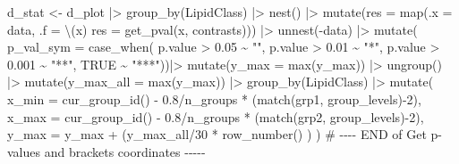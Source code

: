 \documentclass[
  letterpaper,
  DIV=11,
  numbers=noendperiod]{scrreprt}
\newenvironment{Shaded}{\begin{snugshade}}{\end{snugshade}}
\newcommand{\AttributeTok}[1]{\textcolor[rgb]{0.40,0.45,0.13}{#1}}
\newcommand{\CommentTok}[1]{\textcolor[rgb]{0.37,0.37,0.37}{#1}}
\newcommand{\ConstantTok}[1]{\textcolor[rgb]{0.56,0.35,0.01}{#1}}
\newcommand{\DecValTok}[1]{\textcolor[rgb]{0.68,0.00,0.00}{#1}}
\newcommand{\FloatTok}[1]{\textcolor[rgb]{0.68,0.00,0.00}{#1}}
\newcommand{\FunctionTok}[1]{\textcolor[rgb]{0.28,0.35,0.67}{#1}}
\newcommand{\NormalTok}[1]{\textcolor[rgb]{0.00,0.23,0.31}{#1}}
\newcommand{\OtherTok}[1]{\textcolor[rgb]{0.00,0.23,0.31}{#1}}
\newcommand{\RegionMarkerTok}[1]{\textcolor[rgb]{0.00,0.23,0.31}{#1}}
\newcommand{\SpecialCharTok}[1]{\textcolor[rgb]{0.37,0.37,0.37}{#1}}
\newcommand{\StringTok}[1]{\textcolor[rgb]{0.13,0.47,0.30}{#1}}
\begin{document}
\begin{Shaded}
\begin{Highlighting}[]
\NormalTok{d\_stat }\OtherTok{\textless{}{-}}\NormalTok{ d\_plot }\SpecialCharTok{|\textgreater{}}
  \FunctionTok{group\_by}\NormalTok{(LipidClass) }\SpecialCharTok{|\textgreater{}} 
  \FunctionTok{nest}\NormalTok{() }\SpecialCharTok{|\textgreater{}} 
  \FunctionTok{mutate}\NormalTok{(}\AttributeTok{res =} \FunctionTok{map}\NormalTok{(}\AttributeTok{.x =}\NormalTok{ data, }\AttributeTok{.f =}\NormalTok{ \textbackslash{}(x) }\AttributeTok{res =} \FunctionTok{get\_pval}\NormalTok{(x, contrasts))) }\SpecialCharTok{|\textgreater{}} 
  \FunctionTok{unnest}\NormalTok{(}\SpecialCharTok{{-}}\NormalTok{data) }\SpecialCharTok{|\textgreater{}} 
  \FunctionTok{mutate}\NormalTok{(}
    \AttributeTok{p\_val\_sym =} \FunctionTok{case\_when}\NormalTok{(}
\NormalTok{      p.value }\SpecialCharTok{\textgreater{}} \FloatTok{0.05} \SpecialCharTok{\textasciitilde{}} \StringTok{""}\NormalTok{, p.value }\SpecialCharTok{\textgreater{}} \FloatTok{0.01} \SpecialCharTok{\textasciitilde{}} \StringTok{"*"}\NormalTok{, }
\NormalTok{      p.value }\SpecialCharTok{\textgreater{}} \FloatTok{0.001} \SpecialCharTok{\textasciitilde{}} \StringTok{"**"}\NormalTok{, }\ConstantTok{TRUE} \SpecialCharTok{\textasciitilde{}} \StringTok{"***"}\NormalTok{))}\SpecialCharTok{|\textgreater{}}
  \FunctionTok{mutate}\NormalTok{(}\AttributeTok{y\_max =} \FunctionTok{max}\NormalTok{(y\_max)) }\SpecialCharTok{|\textgreater{}}
  \FunctionTok{ungroup}\NormalTok{() }\SpecialCharTok{|\textgreater{}} 
  \FunctionTok{mutate}\NormalTok{(}\AttributeTok{y\_max\_all =} \FunctionTok{max}\NormalTok{(y\_max)) }\SpecialCharTok{|\textgreater{}}
  \FunctionTok{group\_by}\NormalTok{(LipidClass) }\SpecialCharTok{|\textgreater{}} 
  \FunctionTok{mutate}\NormalTok{(}
    \AttributeTok{x\_min =} \FunctionTok{cur\_group\_id}\NormalTok{() }\SpecialCharTok{{-}} \FloatTok{0.8}\SpecialCharTok{/}\NormalTok{n\_groups }\SpecialCharTok{*}\NormalTok{ (}\FunctionTok{match}\NormalTok{(grp1, group\_levels)}\SpecialCharTok{{-}}\DecValTok{2}\NormalTok{),}
    \AttributeTok{x\_max =} \FunctionTok{cur\_group\_id}\NormalTok{() }\SpecialCharTok{{-}} \FloatTok{0.8}\SpecialCharTok{/}\NormalTok{n\_groups }\SpecialCharTok{*}\NormalTok{ (}\FunctionTok{match}\NormalTok{(grp2, group\_levels)}\SpecialCharTok{{-}}\DecValTok{2}\NormalTok{),}
    \AttributeTok{y\_max =}\NormalTok{ y\_max }\SpecialCharTok{+}\NormalTok{ (y\_max\_all}\SpecialCharTok{/}\DecValTok{30} \SpecialCharTok{*} \FunctionTok{row\_number}\NormalTok{() )}
\NormalTok{  )  }
\CommentTok{\# {-}{-}{-}{-} }\RegionMarkerTok{END}\CommentTok{ of Get p{-}values and brackets coordinates  {-}{-}{-}{-}{-}}


\end{Highlighting}
\end{Shaded}
\end{document}
